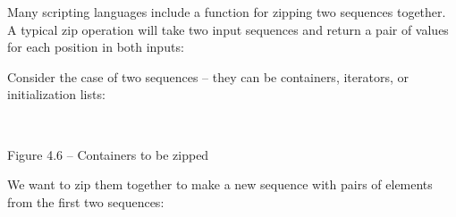 
Many scripting languages include a function for zipping two sequences together. A typical zip operation will take two input sequences and return a pair of values for each position in both inputs: 

Consider the case of two sequences – they can be containers, iterators, or initialization lists:

\hspace*{\fill} \\ %
\begin{center}

Figure 4.6 – Containers to be zipped
\end{center}

We want to zip them together to make a new sequence with pairs of elements from the first two sequences:

